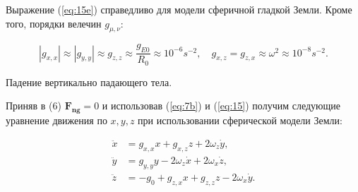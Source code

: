 \documentclass[hoptionsi, twocolumn]{revtex4-2}
\begin{document}
Выражение (\ref{eq:15e}) справедливо для модели сферичной гладкой Земли. Кроме того, порядки велечин $g_{\mu, \nu}$:

\begin{equation}
     |g_{x,x }|\approx |g_{y,y}| \approx g_{z,z} \approx \dfrac{g_{E0}}{R_0}\approx 10^{-6}s^{-2},\quad
    g_{x,z} = g_{z,x} \approx \omega^2 \approx 10^{-8}s^{-2}.\label{eq:16}
\end{equation}


Падение вертикально падающего тела.

Приняв в (6) $\bm{F_{ng}} = 0$ и использовав (\ref{eq:7b}) и (\ref{eq:15}) получим следующие уравнение движения по $x, y, z$ при использовании сферической модели Земли:

\begin{subequations}
\label{eq:17}
    \begin{align}
       \ddot{x} &= g_{x, x}x +g_{x,z}z+2\omega_{z}\dot{y}, \label{eq:17a}\\
    \ddot{y} &= g_{y, y}y -2\omega_{z}\dot{x} +2\omega_{x}\dot{z},\label{eq:17b} \\
     \ddot{z} &= - g_0+ g_{z, x}x + g_{z, z}z-2\omega_{x}\dot{y}.\label{eq:17c} 
    \end{align}
\end{subequations}
\end{document}
